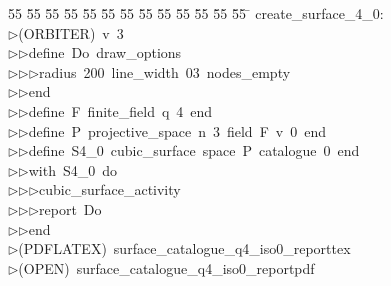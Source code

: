 %
%
\begin{tabbing}
55 \= 55 \= 55 \= 55 \= 55 \= 55 \= 55 \= 55 \= 55 \= 55 \= 55 \= 55 \= 55 \= \kill
create\_surface\_4\_0:\\[0pt]
$\triangleright$\>(ORBITER)\ v\ 3\ \\[0pt]
$\triangleright$\>$\triangleright$\>define\ Do\ draw\_options\ \\[0pt]
$\triangleright$\>$\triangleright$\>$\triangleright$\>radius\ 200\ line\_width\ 03\ nodes\_empty\ \\[0pt]
$\triangleright$\>$\triangleright$\>end\ \\[0pt]
$\triangleright$\>$\triangleright$\>define\ F\ finite\_field\ q\ 4\ end\ \\[0pt]
$\triangleright$\>$\triangleright$\>define\ P\ projective\_space\ n\ 3\ field\ F\ v\ 0\ end\ \\[0pt]
$\triangleright$\>$\triangleright$\>define\ S4\_0\ cubic\_surface\ space\ P\ catalogue\ 0\ end\ \\[0pt]
$\triangleright$\>$\triangleright$\>with\ S4\_0\ do\ \\[0pt]
$\triangleright$\>$\triangleright$\>$\triangleright$\>cubic\_surface\_activity\ \\[0pt]
$\triangleright$\>$\triangleright$\>$\triangleright$\>report\ Do\ \\[0pt]
$\triangleright$\>$\triangleright$\>end\\[0pt]
$\triangleright$\>(PDFLATEX)\ surface\_catalogue\_q4\_iso0\_reporttex\\[0pt]
$\triangleright$\>(OPEN)\ surface\_catalogue\_q4\_iso0\_reportpdf\\[0pt]
\end{tabbing}
